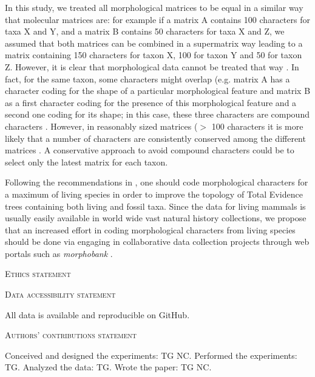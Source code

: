 \documentclass[12pt,letterpaper]{article}
\renewcommand{\section}[1]{%
\bigskip
\begin{center}
\begin{Large}
\normalfont\scshape #1
\medskip
\end{Large}
\end{center}}
\begin{document}
In this study, we treated all morphological matrices to be equal in a similar way that molecular matrices are: for example if a matrix A contains 100 characters for taxa X and Y, and a matrix B contains 50 characters for taxa X and Z, we assumed that both matrices can be combined in a supermatrix way leading to a matrix containing 150 characters for taxon X, 100 for taxon Y and 50 for taxon Z. However, it is clear that morphological data cannot be treated that way \citep{Brazeau2011}. In fact, for the same taxon, some characters might overlap (e.g. matrix A has a character coding for the shape of a particular morphological feature and matrix B as a first character coding for the presence of this morphological feature and a second one coding for its shape; in this case, these three characters are compound characters \citep{Brazeau2011}. However, in reasonably sized matrices ($>$ 100 characters \citep{GuillermeCooper,harrisonamong-character2014} it is more likely that a number of characters are consistently conserved among the different matrices \citep[e.g.][]{ross1998phylogenetic,seiffert2003fossil,marivaux2005anthropoid,seiffert2005basal,bloch2007new,kay2008anatomy,silcox2008biogeographic,seiffert2009convergent,tabuce2009anthropoid,boyer2010astragalar,seiffert2010fossil,marivaux2013djebelemur,ni2013oldest}. A conservative approach to avoid compound characters could be to select only the latest matrix for each taxon.

Following the recommendations in \citep{GuillermeCooper}, one should code morphological characters for a maximum of living species in order to improve the topology of Total Evidence trees containing both living and fossil taxa. Since the data for living mammals is usually easily available in world wide vast natural history collections, we propose that an increased effort in coding morphological characters from living species should be done via engaging in collaborative data collection projects through web portals such as \textit{morphobank} \citep{morphobank}.

\section{Ethics statement}
\section{Data accessibility statement}
All data is available and reproducible on GitHub.
\section{Authors’ contributions statement}
Conceived and designed the experiments: TG NC. Performed the experiments: TG. Analyzed the data: TG. Wrote the paper: TG NC.
\end{document}
